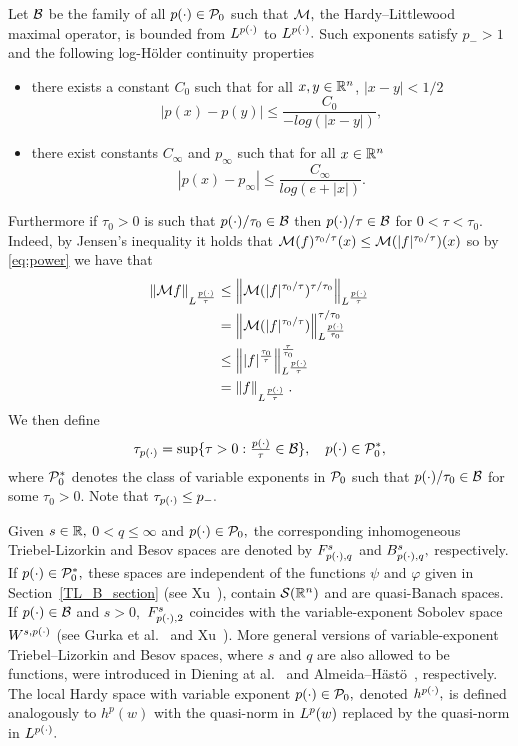 {Let $\B$ be the family of all $\pp \in \P_0$ such that $\M,$  the Hardy--Littlewood maximal operator, is bounded from $\Lp$ to $\Lp.$ Such exponents satisfy $p_- > 1$ and the following log-H\"older continuity properties
\begin{itemize}
\item there exists a constant $C_0$ such that for all $x,y\in \rn$, $|x-y|<1/2$
\[ |p(x)-p(y)| \leq \frac{C_0}{-log(|x-y|)}, \]
\item there exist constants $C_\infty$ and $p_\infty$ such that for all $x\in\rn$ 
\[|p(x) - p_\infty| \leq \frac{C_\infty}{log(e + |x|)}.	 \]
\end{itemize}
Furthermore if 
$\tau_0 >0$ 
is such that 
$p(\cdot)/\tau_0 \in \B$ 
then $\pp/\tau \in \B$ for $0<\tau<\tau_0$. 
Indeed, by Jensen's inequality it holds that 
$\M(f)^{\tau_0/\tau}(x) 
\leq \M(|f|^{\tau_0/\tau})(x)$ 
so by \ref{eq:power} we have that 
\begin{align*}
\norm{\M f}{L^{\frac{p(\cdot)}{\tau}}} &\leq \norm{\M(|f|^{\tau_0/\tau})^{\tau/\tau_0}}{L^{\frac{p(\cdot)}{\tau}}} \\
& = \norm{\M(|f|^{\tau_0/\tau})}{L^{\frac{\pp}{\tau_0} }}^{\tau/\tau_0}\\
& \leq \norm{|f|^{\frac{\tau_0}{\tau}}}{L^{\frac{p(\cdot)}{\tau}}}^{\frac{\tau}{\tau_0}} \\
& = \norm{f}{L^{\frac{p(\cdot)}{\tau}}}.
\end{align*}
We then define
\begin{equation*}
\tau_{\pp}=\sup\{\tau>0:\fr{\pp}{\tau}\in \B\},\quad \pp\in \P_0^*,
\end{equation*}
where $\P_0^*$ denotes the class of variable exponents in $\P_0$ such that $\pp/\tau_0\in\B$ for some $\tau_0>0.$ Note that $\tau_{\pp}\le p_-.$


Given $s\in\re,$ $0<q\le \infty$ and $\pp\in\P_0,$ the corresponding inhomogeneous Triebel-Lizorkin and Besov spaces are denoted by $\itl{\pp}{s}{q}$  and  $\ibes{\pp}{s}{q},$
respectively. If $\pp\in\P_0^*,$ these spaces are independent of the functions $\psi$ and $\varphi$ given in  Section~\ref{TL_B_section} (see  Xu~\cite{MR2431378}), contain $\sw$ and are quasi-Banach spaces. If $\pp\in\B$ and $s>0,$ $\itl{\pp}{s}{2}$ coincides with the variable-exponent  Sobolev space $W^{s,\pp}$ (see Gurka et al.~\cite{MR2339558} and Xu~\cite{MR2449626}). More general versions of variable-exponent  Triebel--Lizorkin and Besov spaces, where $s$ and  $q$ are also allowed to be functions, were introduced in  Diening at al.~\cite{MR2498558} and Almeida--H\"ast\"o~\cite{MR2566313}, respectively. 
The local Hardy space with variable exponent $\pp\in \P_0,$  denoted $h^{\pp},$  is defined analogously to $h^p(w)$ with the quasi-norm in $\lebw{p}{w}$ replaced by the quasi-norm in $\Lp.$ 

}
